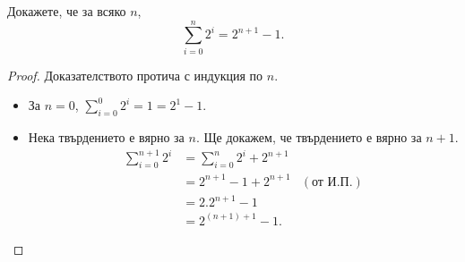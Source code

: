 \begin{problem}
  Докажете, че за всяко $n$, 
  \[\sum^n_{i=0} 2^i = 2^{n+1} - 1.\]
\end{problem}
\begin{proof}
  Доказателството протича с индукция по $n$.
  \begin{itemize}
  \item 
    За $n = 0$, $\sum^0_{i=0}2^i = 1 = 2^{1} - 1$.
  \item
    Нека твърдението е вярно за $n$.
    Ще докажем, че твърдението е вярно за $n+1$.
    \begin{align*}
      \sum^{n+1}_{i=0} 2^i & = \sum^{n}_{i=0}2^i + 2^{n+1}\\
      & = 2^{n+1} - 1 + 2^{n+1} & (\text{от И.П.})\\
      & = 2.2^{n+1} - 1 \\
      & = 2^{(n+1)+1} - 1.
    \end{align*}
  \end{itemize}
\end{proof}



